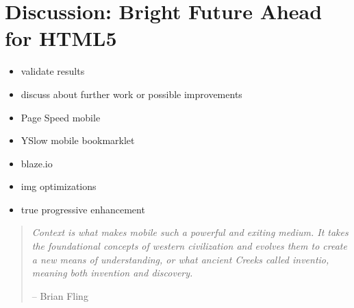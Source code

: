 \chapter{Discussion: Bright Future Ahead for HTML5}
\label{chapter:discussion}

\begin{itemize}
\item validate results
\item discuss about further work or possible improvements
\item Page Speed mobile
\item YSlow mobile bookmarklet
\item blaze.io
\item img optimizations
\item true progressive enhancement
\end{itemize}

\begin{quotation}
  \noindent \textit{Context  is what makes mobile such  a powerful and
    exiting  medium. It  takes  the foundational  concepts of  western
    civilization  and   evolves  them  to   create  a  new   means  of
    understanding,  or what  ancient Creeks  called  inventio, meaning
    both invention and discovery.}
  \begin{flushright}
    -- Brian Fling \cite{fling2009mobile}
  \end{flushright}
\end{quotation}

